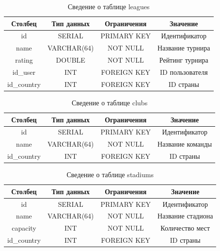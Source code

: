\begin{table}[H]
	\begin{center}
		\caption{Сведение о таблице leagues}
		\begin{tabular}{|c|c|c|c|}
			\hline
			Столбец & Тип данных & Ограничения & Значение \\
			\hline
			id & SERIAL & PRIMARY KEY & Идентификатор \\
			\hline
			name & VARCHAR(64) & NOT NULL & Название турнира \\
			\hline
			rating & DOUBLE & NOT NULL & Рейтинг турнира\\
			\hline
			id\_user & INT & FOREIGN KEY &  ID пользователя \\
			\hline
			id\_country & INT & FOREIGN KEY & ID страны \\
			\hline
		\end{tabular}
		\label{table:db:league}
	\end{center}
\end{table}

\begin{table}[H]
	\begin{center}
		\caption{Сведение о таблице clubs}
		\begin{tabular}{|c|c|c|c|}
			\hline
			Столбец & Тип данных & Ограничения & Значение \\
			\hline
			id & SERIAL & PRIMARY KEY & Идентификатор \\
			\hline
			name & VARCHAR(64) & NOT NULL & Название команды \\
			\hline
			id\_country & INT & FOREIGN KEY & ID страны \\
			\hline
		\end{tabular}
		\label{table:db:club}
	\end{center}
\end{table}

\begin{table}[H]
	\begin{center}
		\caption{Сведение о таблице stadiums}
		\begin{tabular}{|c|c|c|c|}
			\hline
			Столбец & Тип данных & Ограничения & Значение \\
			\hline
			id & SERIAL & PRIMARY KEY & Идентификатор \\
			\hline
			name & VARCHAR(64) & NOT NULL & Название стадиона \\
			\hline
			capacity & INT & NOT NULL & Количество мест \\
			\hline
			id\_country & INT & FOREIGN KEY & ID страны \\
			\hline
		\end{tabular}
		\label{table:db:stadium}
	\end{center}
\end{table}

